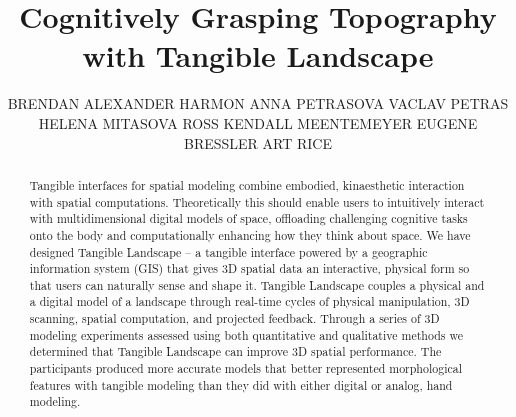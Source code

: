 \documentclass[prodmode,acmtochi]{acmsmall} %
\begin{document}

\title{Cognitively Grasping Topography with Tangible Landscape} 
% 
\author{BRENDAN ALEXANDER HARMON
ANNA PETRASOVA
VACLAV PETRAS
HELENA MITASOVA
ROSS ​KENDALL MEENTEMEYER
EUGENE BRESSLER
ART RICE
}

\begin{abstract}
%
%
Tangible interfaces for spatial modeling
combine embodied, kinaesthetic interaction with spatial computations. 
%
Theoretically this should enable users to 
intuitively interact 
with multidimensional digital models of space,
offloading challenging cognitive tasks onto the body and 
computationally enhancing how they think about space.
% 
We have designed Tangible Landscape 
-- a tangible interface powered by a geographic information system (GIS) 
that gives 3D spatial data an interactive, physical form so that 
users can naturally sense and shape it.
%
Tangible Landscape couples a physical and a digital model of a landscape
through real-time cycles of 
physical manipulation, 3D scanning, spatial computation, and projected feedback.
%
%
Through a series of 
3D modeling experiments 
assessed using both
quantitative %
and qualitative methods 
%
we determined that Tangible Landscape 
can improve 3D spatial performance. 
%
The participants produced more accurate models 
that better represented morphological features 
with tangible modeling than they did with either digital or analog, hand modeling. 



\end{abstract}
\end{document}

